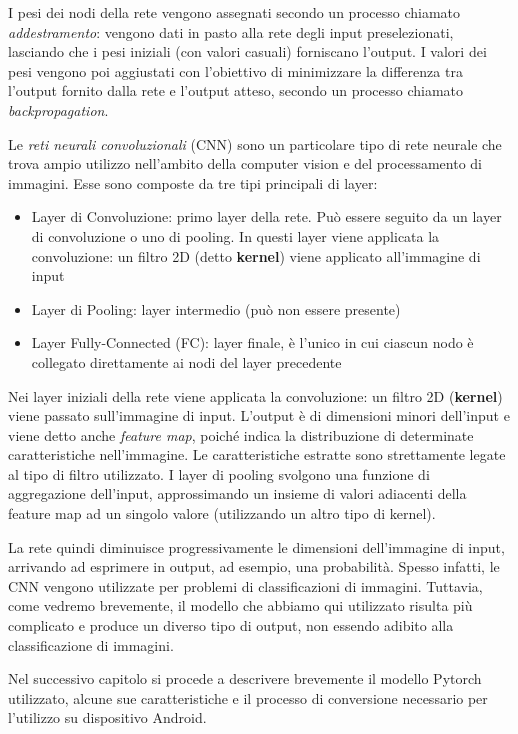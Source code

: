 I pesi dei nodi della rete vengono assegnati secondo un processo chiamato \emph{addestramento}: vengono dati in pasto alla
rete degli input preselezionati, lasciando che i pesi iniziali (con valori casuali) forniscano l'output.
I valori dei pesi vengono poi aggiustati con l'obiettivo di minimizzare la differenza tra l'output fornito dalla rete e
l'output atteso, secondo un processo chiamato \emph{backpropagation}.

Le \textit{reti neurali convoluzionali} (CNN) sono un particolare tipo di rete neurale che trova ampio utilizzo nell'ambito
della computer vision e del processamento di immagini. Esse sono composte da tre tipi principali di layer:

\begin{itemize}
    \item Layer di Convoluzione: primo layer della rete. Può essere seguito da un layer di convoluzione o uno di pooling.
    In questi layer viene applicata la convoluzione: un filtro 2D (detto \textbf{kernel}) viene applicato all'immagine di
    input
    \item Layer di Pooling: layer intermedio (può non essere presente)
    \item Layer Fully-Connected (FC): layer finale, è l'unico in cui ciascun nodo è collegato direttamente ai nodi del
    layer precedente
\end{itemize}

Nei layer iniziali della rete viene applicata la convoluzione: un filtro 2D (\textbf{kernel}) viene passato sull'immagine
di input. L'output è di dimensioni minori dell'input e viene detto anche \textit{feature map}, poiché indica la distribuzione
di determinate caratteristiche nell'immagine. Le caratteristiche estratte sono strettamente legate al tipo di filtro utilizzato.
I layer di pooling svolgono una funzione di aggregazione dell'input, approssimando un insieme di valori adiacenti della feature
map ad un singolo valore (utilizzando un altro tipo di kernel).

La rete quindi diminuisce progressivamente le dimensioni dell'immagine di input, arrivando ad esprimere in output, ad esempio,
una probabilità. Spesso infatti, le CNN vengono utilizzate per problemi di classificazioni di immagini.
Tuttavia, come vedremo brevemente, il modello che abbiamo qui utilizzato risulta più complicato e produce un diverso tipo di 
output, non essendo adibito alla classificazione di immagini.

Nel successivo capitolo si procede a descrivere brevemente il modello Pytorch utilizzato, alcune sue caratteristiche
e il processo di conversione necessario per l'utilizzo su dispositivo Android.